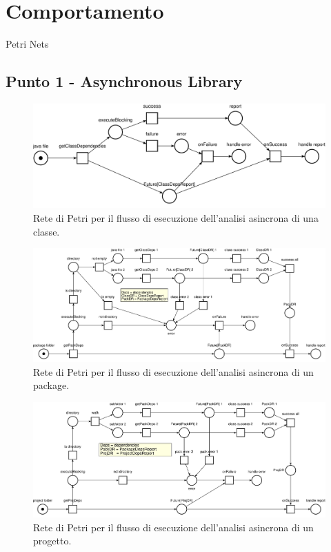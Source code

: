 \documentclass[a4paper,12pt]{report}
\begin{document}
    \chapter{Comportamento}
    Petri Nets
    \section{Punto 1 - Asynchronous Library}

    \begin{figure}[h!]
    \centering
    \includegraphics[width=\textwidth]{petri_nets_pdf/getClassDependencies.pdf}
    \caption{Rete di Petri per il flusso di esecuzione dell'analisi asincrona di una classe.}
    \label{fig:getClassDependencies}
    \end{figure}

    \begin{figure}[h!]
    \centering
    \includegraphics[width=\textwidth]{petri_nets_pdf/getPackageDependencies.pdf}
    \caption{Rete di Petri per il flusso di esecuzione dell'analisi asincrona di un package.}
    \label{fig:getPackageDependencies}
    \end{figure}

    \begin{figure}[h!]
    \centering
    \includegraphics[width=\textwidth]{petri_nets_pdf/getProjectDependencies.pdf}
    \caption{Rete di Petri per il flusso di esecuzione dell'analisi asincrona di un progetto.}
    \label{fig:getProjectDependencies}
    \end{figure}
\end{document}

